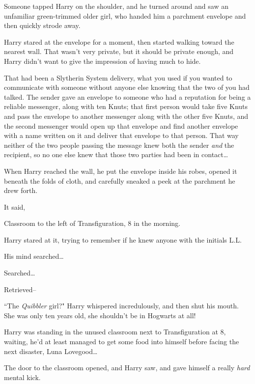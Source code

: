 Someone tapped Harry on the shoulder, and he turned around and saw an unfamiliar green-trimmed older girl, who handed him a parchment envelope and then quickly strode away.

Harry stared at the envelope for a moment, then started walking toward the nearest wall. That wasn't very private, but it should be private enough, and Harry didn't want to give the impression of having much to hide.

That had been a Slytherin System delivery, what you used if you wanted to communicate with someone without anyone else knowing that the two of you had talked. The sender gave an envelope to someone who had a reputation for being a reliable messenger, along with ten Knuts; that first person would take five Knuts and pass the envelope to another messenger along with the other five Knuts, and the second messenger would open up that envelope and find another envelope with a name written on it and deliver that envelope to that person. That way neither of the two people passing the message knew both the sender \emph{and} the recipient, so no one else knew that those two parties had been in contact{\ldots}

When Harry reached the wall, he put the envelope inside his robes, opened it beneath the folds of cloth, and carefully sneaked a peek at the parchment he drew forth.

It said,

\begin{writtenNote}
Classroom to the left of Transfiguration, 8 in the morning.

\end{writtenNote}

Harry stared at it, trying to remember if he knew anyone with the initials L.\?L.

His mind searched{\ldots}

Searched{\ldots}

Retrieved\---

``The \emph{Quibbler} girl?" Harry whispered incredulously, and then shut his mouth. She was only ten years old, she shouldn't be in Hogwarts at all!


Harry was standing in the unused classroom next to Transfiguration at 8\am, waiting, he'd at least managed to get some food into himself before facing the next disaster, Luna Lovegood{\ldots}

The door to the classroom opened, and Harry saw, and gave himself a really \emph{hard} mental kick.

